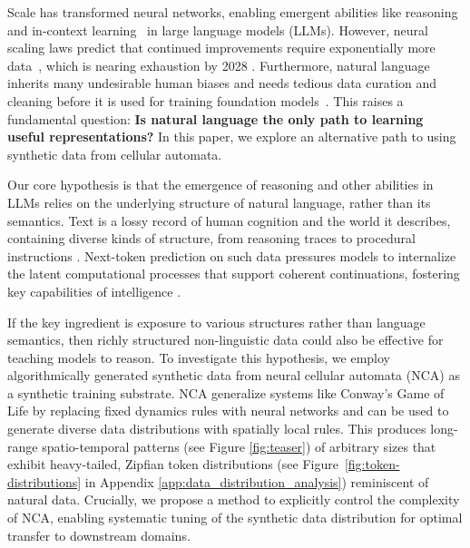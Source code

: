 \documentclass{article}
\theoremstyle{plain}
\theoremstyle{definition}
\theoremstyle{remark}
\begin{document}
Scale has transformed neural networks, enabling emergent abilities like reasoning~\citep{jaech2024openai,jiang2023latent, austin2021program} and in-context learning~\citep{brown2020language, wei2022emergentabilitieslargelanguage, zhao2024distributional} in large language models (LLMs). However, neural scaling laws predict that continued improvements require exponentially more data~\citep{kaplan2020scalinglawsneurallanguage}, which is nearing exhaustion by 2028 \citep{villalobos2022will}. Furthermore, natural language inherits many undesirable human biases and needs tedious data curation and cleaning before it is used for training foundation models~\citep{han2025generalintelligencerequiresrewardbased, an2024measuringgenderracialbiases}. This raises a fundamental question: \textbf{Is natural language the only path to learning useful representations?} In this paper, we explore an alternative path to using synthetic data from cellular automata.

Our core hypothesis is that the emergence of reasoning and other abilities in LLMs relies on the underlying structure of natural language, rather than its semantics. Text is a lossy record of human cognition and the world it describes, containing diverse kinds of structure, from reasoning traces to procedural instructions \citep{fractal-language, ruis2024procedural, cheng2025can, delétang2024languagemodelingcompression}. Next-token prediction on such data pressures models to internalize the latent computational processes that support coherent continuations, fostering key capabilities of intelligence \citep{deletang2023language, jiang2023latent}.

If the key ingredient is exposure to various structures rather than language semantics, then richly structured non-linguistic data could also be effective for teaching models to reason. To investigate this hypothesis, we employ algorithmically generated synthetic data from neural cellular automata (NCA) \citep{mordvintsev2020growing} as a synthetic training substrate. NCA generalize systems like Conway's Game of Life \citep{gardner1970mathematical} by replacing fixed dynamics rules with neural networks and can be used to generate diverse data distributions with spatially local rules. This produces long-range spatio-temporal patterns (see Figure \ref{fig:teaser}) of arbitrary sizes that exhibit heavy-tailed, Zipfian token distributions (see Figure~\ref{fig:token-distributions} in Appendix \ref{app:data_distribution_analysis}) reminiscent of natural data.
Crucially, we propose a method to explicitly control the complexity of NCA, enabling systematic tuning of the synthetic data distribution for optimal transfer to downstream domains. 
\end{document}
